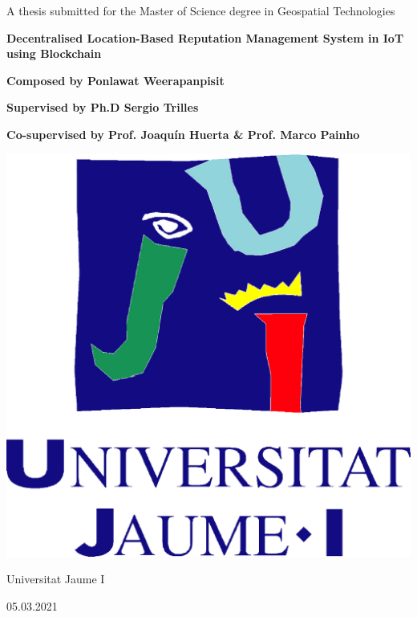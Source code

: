 \begin{titlepage}
  \begin{center}
    \Large
    A thesis submitted for the Master of Science degree in Geospatial Technologies
    
    \vspace*{0.8cm}

    \Huge
    \textbf{Decentralised Location-Based Reputation Management System in IoT using Blockchain}

    \vspace*{1cm}

    \Large
    \textbf{Composed by Ponlawat Weerapanpisit}

    \vspace{1cm}

    \normalsize
    \centering\textbf{Supervised by Ph.D Sergio Trilles}

    \textbf{Co-supervised by Prof. Joaqu\'{i}n Huerta \& Prof. Marco Painho}

    \vspace*{2cm}

    \includegraphics[scale=0.5]{images/uji.png}

    \vspace*{2cm}



    Universitat Jaume I

    \vspace*{0.8cm}

    05.03.2021

    \end{center}
\end{titlepage}